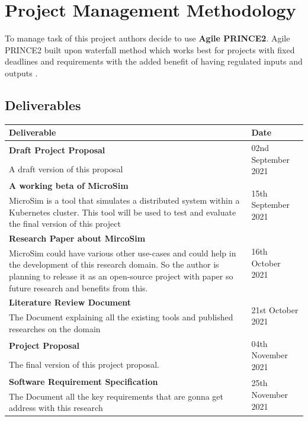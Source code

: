 \section{Project Management Methodology}

To manage task of this project authors decide to use \textbf{Agile PRINCE2}. Agile PRINCE2 built upon waterfall method which works best for projects with fixed deadlines and requirements with the added benefit of having regulated inputs and outputs \citep{WhatAreT79:online}.

\subsection{Deliverables}
\setlength\LTleft{0mm}
\begin{longtable}{|p{115mm}|p{35mm}|}
\hline
\textbf{Deliverable} & \textbf{Date} \\ \hline
\textbf{Draft Project Proposal} & \multirow{2}{*}{02nd September 2021} \\
A draft version of this proposal &  \\ \hline
\textbf{A working beta of MicroSim}\label{microsim} & \multirow{2}{*}{15th September 2021} \\
MicroSim is a tool that simulates a distributed system within a Kubernetes cluster. This tool will be used to test and evaluate the final version of this project &  \\ \hline
\textbf{Research Paper about MircoSim} & \multirow{2}{*}{16th October 2021} \\
MicroSim could have various other use-cases and could help in the development of this research domain. So the author is planning to release it as an open-source project with paper so future research and benefits from this. &  \\ \hline
\textbf{Literature Review Document} & \multirow{2}{*}{21st October 2021} \\
The Document explaining all the existing tools and published researches on the domain &  \\ \hline
\textbf{Project Proposal} & \multirow{2}{*}{04th November 2021} \\
The final version of this project proposal. &  \\ \hline
\textbf{Software Requirement Specification} & \multirow{2}{*}{25th November 2021} \\
The Document all the key requirements that are gonna get address with this research &  \\ \hline

\end{longtable}
